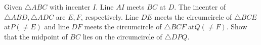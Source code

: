 Given $\triangle ABC$ with incenter $I$. Line $AI$ meets $BC$ at $D$. The incenter of $\triangle ABD, \triangle ADC$ are $E,F$, respectively. Line $DE$ meets the circumcircle of $\triangle BCE$ at$ P(\neq E)$ and line $DF$ meets the circumcircle of $\triangle BCF$ at$ Q(\neq F)$.
Show that the midpoint of $BC$ lies on the circumcircle of $\triangle DPQ$.